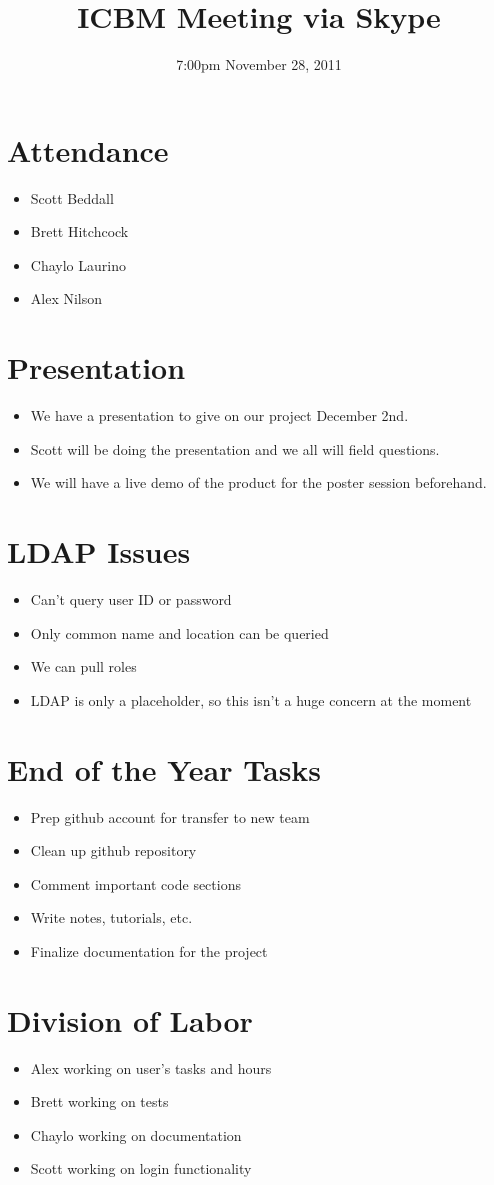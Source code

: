 \documentclass{article}
\begin{document}
\title{ICBM Meeting via Skype}
\date{7:00pm November 28, 2011}
\maketitle

\section{Attendance}
\begin{itemize}
\item Scott Beddall
\item Brett Hitchcock
\item Chaylo Laurino
\item Alex Nilson
\end{itemize}

\section{Presentation}
\begin{itemize}
\item We have a presentation to give on our project December 2nd.
\item Scott will be doing the presentation and we all will field questions.
\item We will have a live demo of the product for the poster session beforehand.
\end{itemize}

\section{LDAP Issues}
\begin{itemize}
\item Can't query user ID or password
\item Only common name and location can be queried
\item We can pull roles
\item LDAP is only a placeholder, so this isn't a huge concern at the moment
\end{itemize}

\section{End of the Year Tasks}
\begin{itemize}
\item Prep github account for transfer to new team
\item Clean up github repository
\item Comment important code sections
\item Write notes, tutorials, etc.
\item Finalize documentation for the project
\end{itemize}

\section{Division of Labor}
\begin{itemize}
\item Alex working on user's tasks and hours
\item Brett working on tests
\item Chaylo working on documentation
\item Scott working on login functionality
\end{itemize}
\end{document}
